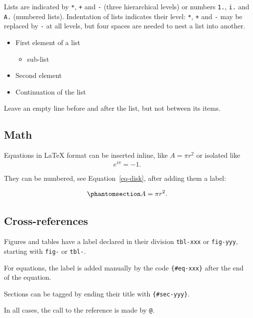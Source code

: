 \documentclass[
  french,
  british,
  11pt,
]{stylisharticle}
\providecommand{\tightlist}{%
  \setlength{\itemsep}{0pt}\setlength{\parskip}{0pt}}
\begin{document}
Lists are indicated by \texttt{*}, \texttt{+} and \texttt{-} (three
hierarchical levels) or numbers \texttt{1.}, \texttt{i.} and \texttt{A.}
(numbered lists). Indentation of lists indicates their level:
\texttt{*}, \texttt{+} and \texttt{-} may be replaced by \texttt{-} at
all levels, but four spaces are needed to nest a list into another.

\begin{itemize}
\tightlist
\item
  First element of a list

  \begin{itemize}
  \tightlist
  \item
    sub-list
  \end{itemize}
\item
  Second element
\item
  Continuation of the list
\end{itemize}

Leave an empty line before and after the list, but not between its
items.

\subsection{Math}\label{math}

Equations in LaTeX format can be inserted inline, like \(A = \pi r^2\)
or isolated like \[e^{i \pi} = -1.\]

They can be numbered, see Equation~\ref{eq-disk}, after adding them a
label:

\begin{equation}\protect\phantomsection\label{eq-disk}{  A = \pi r^2.}\end{equation}

\subsection{Cross-references}\label{cross-references}

Figures and tables have a label declared in their division
\texttt{tbl-xxx} or \texttt{fig-yyy}, starting with \texttt{fig-} or
\texttt{tbl-}.

For equations, the label is added manually by the code
\texttt{\{\#eq-xxx\}} after the end of the equation.

Sections can be tagged by ending their title with
\texttt{\{\#sec-yyy\}}.

In all cases, the call to the reference is made by \texttt{@}.
\end{document}
